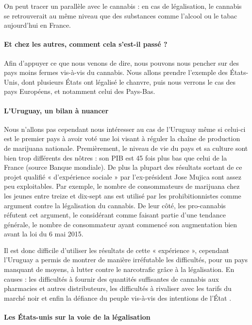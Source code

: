 On peut tracer un parallèle avec le cannabis : en cas de légalisation, le cannabis se retrouverait au même niveau que des substances comme l’alcool ou le tabac aujourd’hui en France. 


\paragraph{Et chez les autres, comment cela s'est-il passé ?}

Afin d’appuyer ce que nous venons de dire, nous pouvons nous pencher sur des pays moins fermes vis-à-vis du cannabis. Nous allons prendre l’exemple des États-Unis, dont plusieurs États ont légalisé le chanvre, puis nous verrons le cas des pays Européens, et notamment celui des Pays-Bas.

\paragraph{L'Uruguay, un bilan à nuancer}

Nous n’allons pas cependant nous intéresser au cas de l’Uruguay même si celui-ci est le premier pays à avoir voté une loi visant à réguler la chaîne de production de marijuana nationale. Premièrement, le niveau de vie du pays et sa culture sont bien trop différents des nôtres : son PIB est 45 fois plus bas que celui de la France (source Banque mondiale). De plus la plupart des résultats sortant de ce projet qualifié « d’expérience sociale » par l’ex-président Jose Mujica sont assez peu exploitables. Par exemple, le nombre de consommateurs de marijuana chez les jeunes entre treize et dix-sept ans est utilisé par les prohibitionnistes comme argument contre la légalisation du cannabis. De leur côté, les pro-cannabis réfutent cet argument, le considérant comme faisant partie d’une tendance générale, le nombre de consommateur ayant commencé son augmentation bien avant la loi du 6 mai 2015. 

Il est donc difficile d'utiliser les résultats de cette « expérience », cependant l’Uruguay a permis de montrer de manière irréfutable les difficultés, pour un pays manquant de moyens, à lutter contre le narcotrafic grâce à la légalisation. En causes : les difficultés à fournir des quantités suffisantes de cannabis aux pharmacies et autres distributeurs, les difficultés à rivaliser avec les tarifs du marché noir et enfin la défiance du peuple vis-à-vis des intentions de l’État .

\paragraph{Les États-unis sur la voie de la légalisation }

